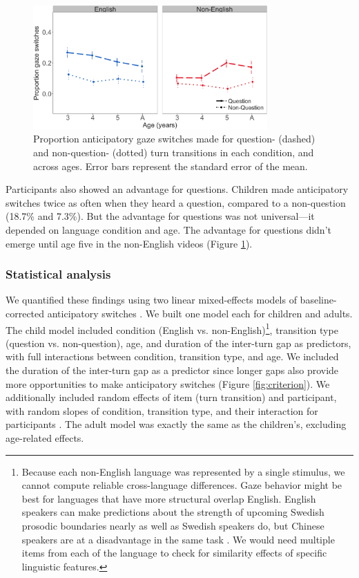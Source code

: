 \documentclass[authoryear, 12pt]{elsarticle}
\begin{document}
\begin{figure}[t]
\begin{center}
\includegraphics[width=0.8\textwidth]{figures/FIG-QvsNQ-FL.png}
\end{center}
\caption{Proportion anticipatory gaze switches made for question- (dashed) and non-question- (dotted) turn transitions in each condition, and across ages. Error bars represent the standard error of the mean.} 
\label{fig:questionsFL}
\end{figure}

Participants also showed an advantage for questions. Children made anticipatory switches twice as often when they heard a question, compared to a non-question (18.7\% and 7.3\%). But the advantage for questions was not universal---it depended on language condition and age. The advantage for questions didn't emerge until age five in the non-English videos (Figure \ref{fig:questionsFL}).

\subsubsection{Statistical analysis}

We quantified these findings using two linear mixed-effects models of baseline-corrected anticipatory switches \citep{lme4, R}. We built one model each for children and adults. The child model included condition (English vs. non-English)\footnote{Because each non-English language was represented by a single stimulus, we cannot compute reliable cross-language differences. Gaze behavior might be best for languages that have more structural overlap English. English speakers can make predictions about the strength of upcoming Swedish prosodic boundaries nearly as well as Swedish speakers do, but Chinese speakers are at a disadvantage in the same task \cite{carlson2005}. We would need multiple items from each of the language to check for similarity effects of specific linguistic features.}, transition type (question vs. non-question), age, and duration of the inter-turn gap as predictors, with full interactions between condition, transition type, and age.  We included the duration of the inter-turn gap as a predictor since longer gaps also provide more opportunities to make anticipatory switches (Figure \ref{fig:criterion}). We additionally included random effects of item (turn transition) and participant, with random slopes of condition, transition type, and their interaction for participants \citep{barr2013}. The adult model was exactly the same as the children's, excluding age-related effects.
\end{document}
